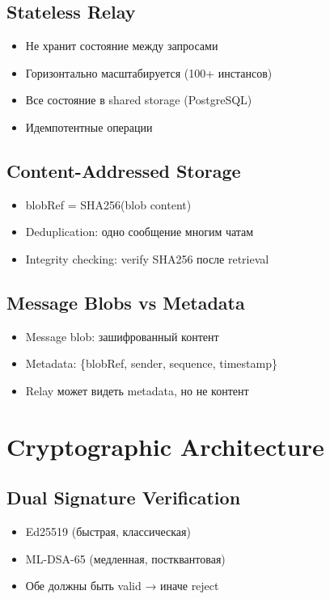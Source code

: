 \documentclass[11pt,a4paper,oneside]{book}
\begin{document}
\vspace{-0.2cm}\subsection{Stateless Relay}
\begin{itemize}
  \item Не хранит состояние между запросами
  \item Горизонтально масштабируется (100+ инстансов)
  \item Все состояние в shared storage (PostgreSQL)
  \item Идемпотентные операции
\end{itemize}
\vspace{-0.2cm}\subsection{Content-Addressed Storage}
\begin{itemize}
  \item blobRef = SHA256(blob content)
  \item Deduplication: одно сообщение многим чатам
  \item Integrity checking: verify SHA256 после retrieval
\end{itemize}
\vspace{-0.2cm}\subsection{Message Blobs vs Metadata}
\begin{itemize}
  \item Message blob: зашифрованный контент
  \item Metadata: \{blobRef, sender, sequence, timestamp\}
  \item Relay может видеть metadata, но не контент
\end{itemize}
\vspace{-0.3cm}\section{Cryptographic Architecture}
\vspace{-0.2cm}\subsection{Dual Signature Verification}
\begin{itemize}
  \item Ed25519 (быстрая, классическая)
  \item ML-DSA-65 (медленная, постквантовая)
  \item Обе должны быть valid → иначе reject
\end{itemize}
\end{document}
